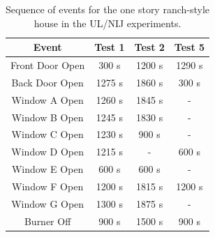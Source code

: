 \begin{table}[ht!]
\centering
\caption[Sequence of events for the one story ranch-style house in the UL/NIJ experiments]
{Sequence of events for the one story ranch-style house in the UL/NIJ experiments.}
\label{Ranch_events}
\begin{tabular}{|c||c|c|c|}
\hline
Event          & Test 1     & Test 2    & Test 5    \\ \hline \hline
Front Door Open & 300 s    & 1200 s    & 1290 s    \\ \hline
Back Door Open  & 1275 s    & 1860 s    & 300 s    \\ \hline
Window A Open     & 1260 s    & 1845 s    & -       \\ \hline
Window B Open     & 1245 s    & 1830 s    & -       \\ \hline
Window C Open     & 1230 s    & 900 s    & -       \\ \hline
Window D Open     & 1215 s    & -       & 600 s    \\ \hline
Window E Open     & 600 s    & 600 s    & -       \\ \hline
Window F Open     & 1200 s    & 1815 s    & 1200 s    \\ \hline
Window G Open     & 1300 s    & 1875 s    & -       \\ \hline
Burner Off       & 900 s    & 1500 s    & 900 s    \\ \hline
\end{tabular}
\end{table}

